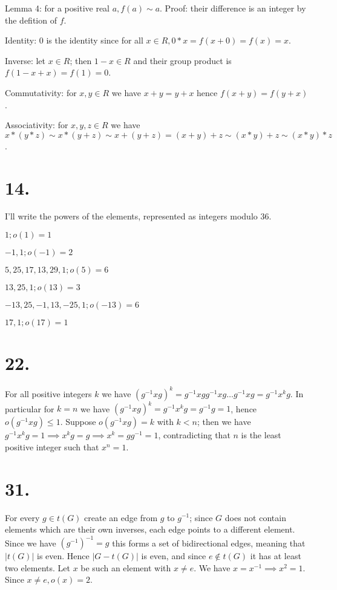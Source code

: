 \documentclass{article}
\begin{document}
Lemma 4: for a positive real $a, f(a) \sim a$. Proof: their difference is an integer by the defition of $f$.

Identity: $0$ is the identity since for all $x \in R, 0*x = f(x+0) = f(x) = x$.

Inverse: let $x \in R$; then $1-x \in R$ and their group product is $f(1-x+x) = f(1) = 0$.

Commutativity: for $x, y \in R$ we have $x+y = y+x$ hence $f(x+y) = f(y+x)$.

Associativity: for $x, y, z \in R$ we have $x*(y*z) \sim x*(y+z) \sim x+(y+z) = (x+y)+z \sim (x*y)+z \sim (x*y)*z$.

\section*{14.}

I'll write the powers of the elements, represented as integers modulo $36$.

$1; o(1)=1$ 

$-1, 1; o(-1) = 2$

$5, 25, 17, 13, 29, 1; o(5) = 6$

$13, 25, 1; o(13) = 3$

$-13, 25, -1, 13, -25, 1; o(-13) = 6$

$17, 1; o(17) = 1$

\section*{22.}

For all positive integers $k$ we have $(g^{-1}xg)^k = g^{-1}xg g^{-1}xg \ldots g^{-1}xg = g^{-1}x^kg$. In particular for $k=n$ we have $(g^{-1}xg)^k = g^{-1}x^kg = g^{-1}g = 1$, hence $o(g^{-1}xg) \le 1$. Suppose $o(g^{-1}xg) = k$ with $k < n$; then we have $g^{-1}x^kg = 1 \implies x^k g = g \implies x^k = g g^{-1} = 1$, contradicting that $n$ is the least positive integer such that $x^n = 1$.

\section*{31.}

For every $g \in t(G)$ create an edge from $g$ to $g^{-1}$; since $G$ does not contain elements which are their own inverses, each edge points to a different element. Since we have $(g^{-1})^{-1} = g$ this forms a set of bidirectional edges, meaning that $|t(G)|$ is even. Hence $|G - t(G)|$ is even, and since $e \not\in t(G)$ it has at least two elements. Let $x$ be such an element with $x \ne e$. We have $x = x^{-1} \implies x^2 = 1$. Since $x \ne e, o(x) = 2$.
\end{document}
